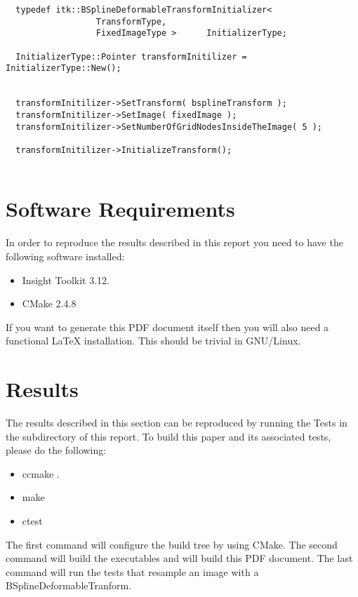 \documentclass{InsightArticle}
\begin{document}
\small
\begin{verbatim}
  typedef itk::BSplineDeformableTransformInitializer<
                  TransformType, 
                  FixedImageType >      InitializerType;

  InitializerType::Pointer transformInitilizer = InitializerType::New();


  transformInitilizer->SetTransform( bsplineTransform );
  transformInitilizer->SetImage( fixedImage );
  transformInitilizer->SetNumberOfGridNodesInsideTheImage( 5 );

  transformInitilizer->InitializeTransform();
 
\end{verbatim}
\normalsize


\section{Software Requirements}

In order to reproduce the results described in this report you need to have the
following software installed:

\begin{itemize}
  \item  Insight Toolkit 3.12.
  \item  CMake 2.4.8
\end{itemize}

If you want to generate this PDF document itself then you will also need a
functional LaTeX installation. This should be trivial in GNU/Linux.

\appendix

\section{Results}

The results described in this section can be reproduced by running the Tests in
the  subdirectory of this report. To build this paper and its
associated tests, please do the following:

\begin{itemize}
\item ccmake .
\item make
\item ctest
\end{itemize}

The first command will configure the build tree by using CMake. The second
command will build the executables and will build this PDF document. The last
command will run the tests that resample an image with a
BSplineDeformableTranform. 
\end{document}
